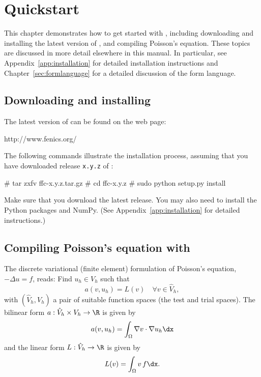 \chapter{Quickstart}

This chapter demonstrates how to get started with \ffc{}, including
downloading and installing the latest version of \ffc{}, and compiling
Poisson's equation. These topics are discussed in more detail
elsewhere in this manual. In particular, see
Appendix~\ref{app:installation} for detailed installation instructions
and Chapter~\ref{sec:formlanguage} for a detailed discussion of the
form language.

\section{Downloading and installing \ffc{}}

The latest version of \ffc{} can be found on the \fenics{} web page:
\begin{code}
http://www.fenics.org/
\end{code}
The following commands illustrate the installation process, assuming
that you have downloaded release \texttt{x.y.z} of \ffc{}:
\begin{code}
# tar zxfv ffc-x.y.z.tar.gz
# cd ffc-x.y.z
# sudo python setup.py install
\end{code}
Make sure that you download the latest release.
You may also need to install the Python packages \fiat{} and
NumPy. (See Appendix~\ref{app:installation} for detailed instructions.)

\section{Compiling Poisson's equation with \ffc{}}

The discrete variational (finite element) formulation of Poisson's
equation, $-\Delta u = f$, reads: Find $u_h \in V_h$ such that
\begin{equation} \label{eq:varform}
  a(v, u_h) = L(v) \quad \forall v\in \hat{V}_h, 
\end{equation}
with $(\hat{V}_h, V_h)$ a pair of suitable function spaces (the test and
trial spaces). The bilinear form $a : \hat{V}_h \times V_h \rightarrow
\R$ is given by
\begin{equation}
  a(v, u_h) = \int_{\Omega} \nabla v \cdot \nabla u_h \dx
\end{equation}
and the linear form $L : \hat{V}_h \rightarrow \R$ is given by
\begin{equation}
  L(v) = \int_{\Omega} v \, f \dx.
\end{equation}

